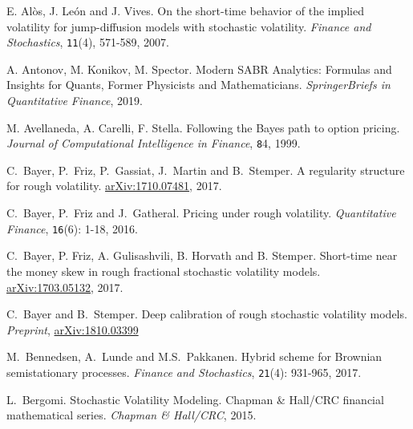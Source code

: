 \documentclass{article}
\theoremstyle{remark}
\begin{document}
\begin{thebibliography}{99}

E. Al\`os, J. Le\'on and J. Vives. 
On the short-time behavior of the implied volatility for jump-diffusion models with stochastic volatility. 
\textit{Finance and Stochastics}, {\tt 11}(4), 571-589, 2007.

A. Antonov, M. Konikov, M. Spector.
Modern SABR Analytics: Formulas and Insights for Quants, Former Physicists and Mathematicians.
\textit{SpringerBriefs in Quantitative Finance}, 2019.

M. Avellaneda, A. Carelli, F. Stella.
Following the Bayes path to option pricing.
\textit{Journal of Computational Intelligence in Finance}, {\tt 8}4, 1999.


C.~Bayer, P.~Friz, P.~Gassiat, J.~Martin and B.~Stemper.
A regularity structure for rough volatility. 
\href{https://arxiv.org/abs/1710.07481}{arXiv:1710.07481}, 2017.

C.~Bayer, P.~Friz  and J.~Gatheral.
Pricing under rough volatility. 
\textit{Quantitative Finance}, {\tt 16}(6): 1-18, 2016.

C.~Bayer, P. Friz, A. Gulisashvili, B. Horvath and B. Stemper.
Short-time near the money skew in rough fractional stochastic volatility models.
\href{https://arxiv.org/abs/1703.05132}{arXiv:1703.05132}, 2017.


C.~Bayer and B.~Stemper. Deep calibration of rough stochastic volatility models. \textit{Preprint}, \href{https://arxiv.org/pdf/1810.03399.pdf}{arXiv:1810.03399}

 M.~Bennedsen, A.~Lunde and M.S.~Pakkanen. 
Hybrid scheme for Brownian semistationary processes. 
\textit{Finance and Stochastics}, {\tt 21}(4): 931-965, 2017.

L.~Bergomi. Stochastic Volatility Modeling.
Chapman \& Hall/CRC financial mathematical series.  \textit{Chapman \& Hall/CRC}, 2015.



\end{thebibliography}
\end{document}
